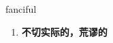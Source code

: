 
\begin{frame}
{\huge fanciful}
\begin{center}
\begin{enumerate}\Large
  \item \textbf{不切实际的，荒谬的}
\end{enumerate}
\end{center}
\end{frame}
